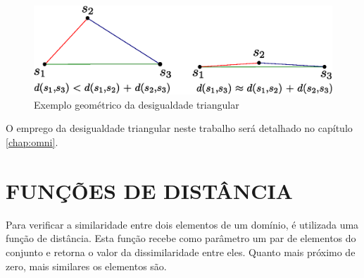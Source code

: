\begin{figure}[H]
\centering
\includegraphics[width=.8\textwidth]{dados/figuras/desig_tri.eps}
\caption{Exemplo geométrico da desigualdade triangular}
\label{fig:destri}
\end{figure}

O emprego da desigualdade triangular neste trabalho será detalhado no capítulo \ref{chap:omni}.

\section{FUNÇÕES DE DISTÂNCIA}
\label{sec:funcdist}
Para verificar a similaridade entre dois elementos de um domínio, é utilizada uma função de distância. Esta função recebe como parâmetro um par
de elementos do conjunto e retorna o valor da dissimilaridade entre eles. Quanto mais próximo de zero, mais similares os elementos são.





